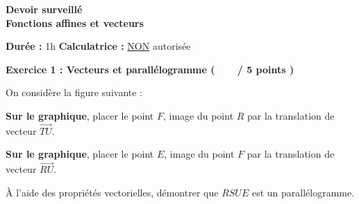 \documentclass[12pt,a4paper]{exam}
\begin{document}
\begin{center}
    \Large\textbf{Devoir surveillé\\Fonctions affines et vecteurs}
\end{center}

\vspace{0.3cm}

\noindent
\textbf{Durée :} 1h \hfill
\textbf{Calculatrice :} \underline{NON} autorisée

\vspace{0.5cm}

\noindent
\textbf{Exercice 1 : Vecteurs et parallélogramme (\ \ \ \  / 5 points )}
\vspace{5pt}

On considère la figure suivante :

\begin{center}
\end{center}

\begin{questions}

\question[1,5] \textbf{Sur le graphique}, placer le point $F$, image du point $R$ par la translation de 
vecteur $\overrightarrow{TU}$.

\question[1,5] \textbf{Sur le graphique}, placer le point $E$, image du point $F$ par la translation de 
vecteur $\overrightarrow{RU}$.

\question[2] À l'aide des propriétés vectorielles, démontrer que $RSUE$ est un parallélogramme.

\end{questions}
\end{document}
